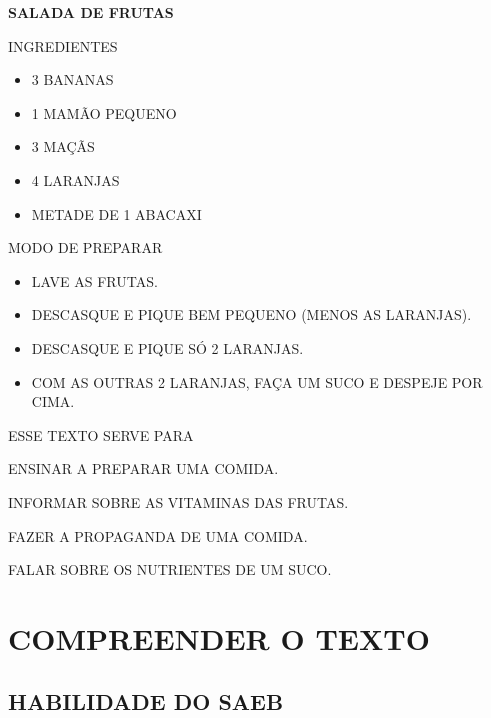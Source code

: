 \begin{myquote}
\textbf{SALADA DE FRUTAS}


INGREDIENTES
\begin{itemize}
\item 3 BANANAS
\item 1 MAMÃO PEQUENO
\item 3 MAÇÃS
\item 4 LARANJAS
\item METADE DE 1 ABACAXI
\end{itemize}


MODO DE PREPARAR
\begin{itemize}
\item
  LAVE AS FRUTAS.
\item
  DESCASQUE E PIQUE BEM PEQUENO (MENOS AS LARANJAS).
\item
  DESCASQUE E PIQUE SÓ 2 LARANJAS.
\item
  COM AS OUTRAS 2 LARANJAS, FAÇA UM SUCO E DESPEJE POR CIMA.
\end{itemize}
\end{myquote}

ESSE TEXTO SERVE PARA

\begin{escolha}
\item ENSINAR A PREPARAR UMA COMIDA.

\item INFORMAR SOBRE AS VITAMINAS DAS FRUTAS.

\item FAZER A PROPAGANDA DE UMA COMIDA.

\item FALAR SOBRE OS NUTRIENTES DE UM SUCO.
\end{escolha}



\chapter{COMPREENDER O TEXTO}

\enlargethispage{2\baselineskip}

\section*{HABILIDADE DO SAEB}

